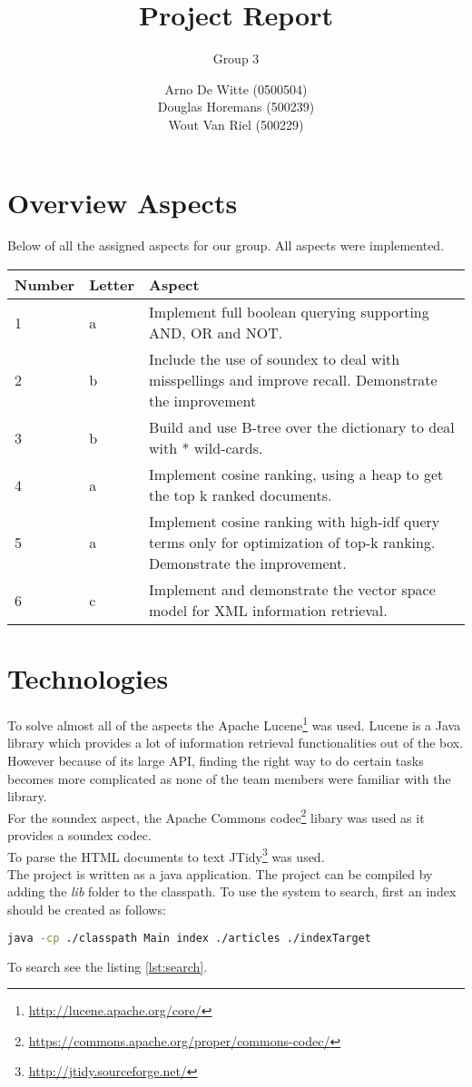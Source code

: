 \documentclass{article}
\title{Project Report}
\subtitle{Group 3}
\author{Arno De Witte (0500504)\\Douglas Horemans (500239)\\Wout Van Riel (500229)}
\begin{document}
\maketitle


\section{Overview Aspects}
Below of all the assigned aspects for our group. All aspects were implemented. \\
\begin{center}
	\begin{tabular}{ | l | l | p{10cm} |}
		\hline
		Number & Letter & Aspect                                                                    \\ \hline
		1      & a      & Implement full boolean querying supporting AND, OR and NOT.               \\ \hline
		2      & b      & Include the use of soundex to deal with misspellings and improve recall.
		Demonstrate the improvement \\ \hline
		3      & b      & Build and use B-tree over the dictionary to deal with * wild-cards.       \\ \hline
		4      & a      & Implement cosine ranking, using a heap to get the top k ranked documents. \\ \hline
		5      & a      & Implement cosine ranking with high-idf query terms only for optimization
		of top-k ranking. Demonstrate the improvement. \\ \hline
		6      & c      & Implement and demonstrate the vector space model for XML information
		retrieval. \\
		\hline
	\end{tabular}
\end{center}

\section{Technologies}
To solve almost all of the aspects the Apache Lucene\footnote{\url{http://lucene.apache.org/core/}} was used. Lucene is a Java library which provides a lot of information retrieval functionalities out of the box. However because of its large API, finding the right way to do certain tasks becomes more complicated as none of the team members were familiar with the library. \\
For the soundex aspect, the Apache Commons codec\footnote{\url{https://commons.apache.org/proper/commons-codec/}} libary was used as it provides a soundex codec.\\
To parse the HTML documents to text JTidy\footnote{\url{http://jtidy.sourceforge.net/}} was used.\\
The project is written as a java application. The project can be compiled by adding the \emph{lib} folder to the classpath. To use the system to search, first an index should be created as follows:
\begin{lstlisting}[language=Bash]
java -cp ./classpath Main index ./articles ./indexTarget
\end{lstlisting}
To search see the listing \ref{lst:search}.
\end{document}
